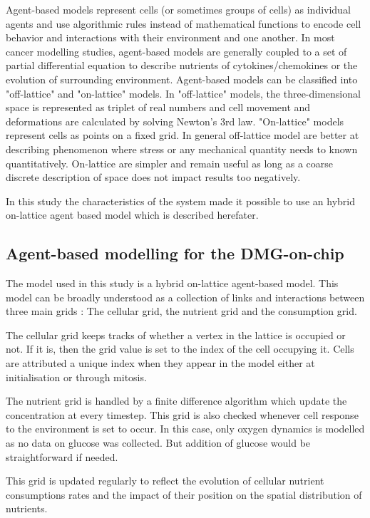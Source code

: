\documentclass[11pt,a4paper]{article}
\begin{document}
Agent-based models represent cells (or sometimes groups of cells) as individual agents and use algorithmic rules instead of mathematical functions to encode cell behavior and interactions with their environment and one another. In most cancer modelling studies, agent-based models are generally coupled to a set of partial differential equation to describe nutrients of cytokines/chemokines or the evolution of surrounding environment. Agent-based models can be classified into "off-lattice" and "on-lattice" models.\cite{Osborne2017} In "off-lattice" models, the three-dimensional space is represented as triplet of real numbers and cell movement and deformations are calculated by solving Newton's 3rd law. "On-lattice" models represent cells as points on a fixed grid. In general off-lattice model are better at describing phenomenon where stress or any mechanical quantity needs to known quantitatively. On-lattice are simpler and remain useful as long as a coarse discrete description of space does not impact results too negatively.

In this study the characteristics of the system made it possible to use an hybrid on-lattice agent based model which is described herefater.

\subsection{Agent-based modelling for the DMG-on-chip}
The model used in this study is a hybrid on-lattice agent-based model. This model can be broadly understood as a collection of links and interactions between three main grids : The cellular grid, the nutrient grid and the consumption grid. 

The cellular grid keeps tracks of whether a vertex in the lattice is occupied or not. If it is, then the grid value is set to the index of the cell occupying it. Cells are attributed a unique index when they appear in the model either at initialisation or through mitosis.

The nutrient grid is handled by a finite difference algorithm which update the concentration at every timestep. This grid is also checked whenever cell response to the environment is set to occur. In this case, only oxygen dynamics is modelled as no data on glucose was collected. But addition of glucose would be straightforward if needed.

This grid is updated regularly to reflect the evolution of cellular nutrient consumptions rates and the impact of their position on the spatial distribution of nutrients.
\end{document}
